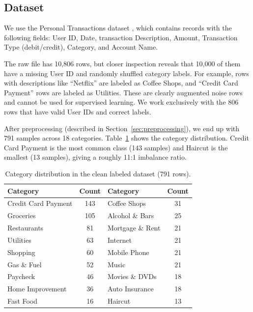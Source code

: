 \documentclass[11pt]{article}
\begin{document}
\subsection{Dataset}

We use the Personal Transactions dataset \cite{dataset}, which contains records with the following fields: User ID, Date, transaction Description, Amount, Transaction Type (debit/credit), Category, and Account Name.

The raw file has 10,806 rows, but closer inspection reveals that 10,000 of them have a missing User ID and randomly shuffled category labels. For example, rows with descriptions like ``Netflix'' are labeled as Coffee Shops, and ``Credit Card Payment'' rows are labeled as Utilities. These are clearly augmented noise rows and cannot be used for supervised learning. We work exclusively with the 806 rows that have valid User IDs and correct labels.

After preprocessing (described in Section~\ref{sec:preprocessing}), we end up with 791 samples across 18 categories. Table~\ref{tab:categories} shows the category distribution. Credit Card Payment is the most common class (143 samples) and Haircut is the smallest (13 samples), giving a roughly 11:1 imbalance ratio.

\begin{table}[H]
  \centering
  \caption{Category distribution in the clean labeled dataset (791 rows).}
  \label{tab:categories}
  \small
  \begin{tabular}{lc|lc}
    \toprule
    Category & Count & Category & Count \\
    \midrule
    Credit Card Payment & 143 & Coffee Shops      & 31 \\
    Groceries           & 105 & Alcohol \& Bars   & 25 \\
    Restaurants         &  81 & Mortgage \& Rent  & 21 \\
    Utilities           &  63 & Internet          & 21 \\
    Shopping            &  60 & Mobile Phone      & 21 \\
    Gas \& Fuel         &  52 & Music             & 21 \\
    Paycheck            &  46 & Movies \& DVDs    & 18 \\
    Home Improvement    &  36 & Auto Insurance    & 18 \\
    Fast Food           &  16 & Haircut           & 13 \\
    \bottomrule
  \end{tabular}
\end{table}
\end{document}
